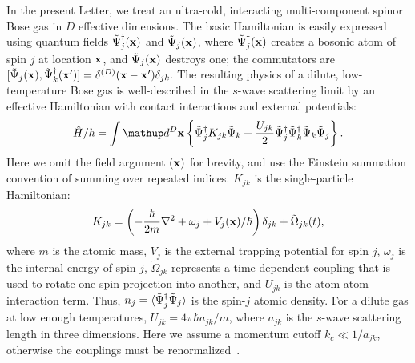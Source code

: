 In the present Letter, we treat an ultra-cold,
interacting multi-component spinor Bose gas in $D$ effective dimensions.
The basic Hamiltonian is easily expressed using quantum fields
$\tilde{\Psi}_j^{\dagger}(\mathbf{x})$ and $\tilde{\Psi}_j(\mathbf{x})$,
where $\tilde{\Psi}_j^{\dagger}(\mathbf{x})$ creates a bosonic atom of spin $j$
at location $\mathbf{x}$, and $\tilde{\Psi}_j(\mathbf{x})$ destroys one;
the commutators are
$[\tilde{\Psi}_j(\mathbf{x}),\tilde{\Psi}_k^{\dagger}(\mathbf{x}^\prime)] =
\delta^{(D)}(\mathbf{x}-\mathbf{x}^\prime)\delta_{jk}.$
The resulting physics of a dilute, low-temperature Bose gas
is well-described in the $s$-wave scattering limit by an effective Hamiltonian
with contact interactions and external potentials:
\begin{equation}
    \hat{H} / \hbar = \int \upd^{D}\xvec \left\{
        \Psiop_j^{\dagger} K_{jk} \Psiop_k +
        \frac{U_{jk}}{2} \Psiop_j^{\dagger} \Psiop_k^{\dagger}
        \Psiop_k \Psiop_j
    \right\}.
\end{equation}
Here we omit the field argument $(\mathbf{x})$ for brevity,
and use the Einstein summation convention of summing over repeated indices.
$K_{jk}$ is the single-particle Hamiltonian:
\begin{equation}
    K_{jk} = \left( -\frac{\hbar}{2m} \nabla^2 + \omega_j + V_j(\mathbf{x}) / \hbar \right) \delta_{jk} +
        \tilde{\Omega}_{jk}(t),
\end{equation}
where $m$ is the atomic mass, $V_j$ is the external trapping potential for spin $j$,
$\omega_j$ is the internal energy of spin $j$,
$\tilde{\Omega}_{jk}$ represents a time-dependent coupling
that is used to rotate one spin projection into another,
and $U_{jk}$ is the atom-atom interaction term.
Thus, $n_j = \langle \tilde{\Psi}_j^{\dagger} \tilde{\Psi}_j \rangle$
is the spin-$j$ atomic density.
For a dilute gas at low enough temperatures,
$U_{jk}=4\pi\hbar a_{jk} / m$, where $a_{jk}$ is the $s$-wave scattering length in three dimensions.
Here we assume a momentum cutoff $k_{c} \ll 1 / a_{jk}$,
otherwise the couplings must be renormalized~\cite{Sinatra2002}.
